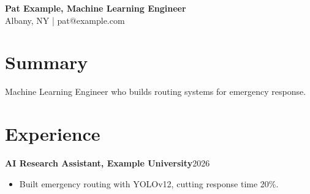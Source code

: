 \documentclass{article}
\begin{document}
\textbf{Pat Example, Machine Learning Engineer}\\ Albany, NY | pat@example.com
\section{Summary}
Machine Learning Engineer who builds routing systems for emergency response.
\section{Experience}
\textbf{AI Research Assistant, Example University}\hfill 2026
\begin{itemize}
\item Built emergency routing with YOLOv12, cutting response time 20\%.
\end{itemize}
\end{document}
